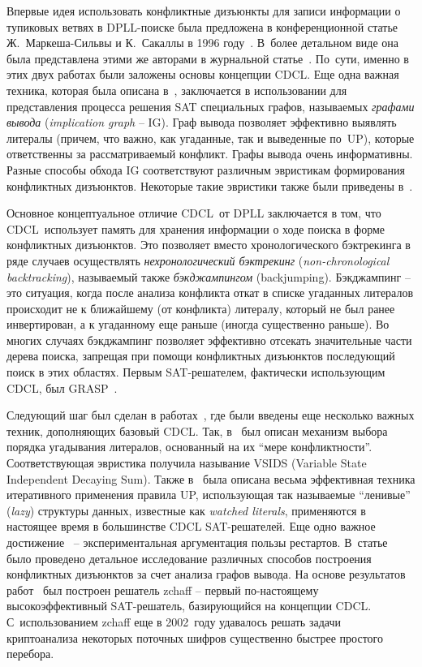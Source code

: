 Впервые идея использовать конфликтные дизъюнкты для записи информации о тупиковых ветвях в DPLL-поиске была предложена в конференционной статье Ж.~Маркеша-Сильвы и К.~Сакаллы в 1996 году~\cite{grasp}.
В~более детальном виде она была представлена этими же авторами в журнальной статье~\cite{marques-silva1999}.
По~сути, именно в этих двух работах были заложены основы концепции CDCL.
Еще одна важная техника, которая была описана в~\cite{grasp,marques-silva1999}, заключается в использовании для представления процесса решения SAT специальных графов, называемых \textit{графами вывода} (\textit{implication graph} \--- IG).
Граф вывода позволяет эффективно выявлять литералы (причем, что важно, как угаданные, так и выведенные по~UP), которые ответственны за рассматриваемый конфликт.
Графы вывода очень информативны.
Разные способы обхода IG соответствуют различным эвристикам формирования конфликтных дизъюнктов. Некоторые такие эвристики также были приведены в~\cite{grasp,marques-silva1999}.

Основное концептуальное отличие CDCL~от DPLL заключается в том, что CDCL~использует память для хранения информации о ходе поиска в форме конфликтных дизъюнктов.
Это позволяет вместо хронологического бэктрекинга в ряде случаев осуществлять \textit{нехронологический бэктрекинг} (\textit{non-chronological backtracking}), называемый также \textit{бэкджампингом} (backjumping).
Бэкджампинг \--- это ситуация, когда после анализа конфликта откат в списке угаданных литералов происходит не к ближайшему (от конфликта) литералу, который не был ранее инвертирован, а к угаданному еще раньше (иногда существенно раньше).
Во многих случаях бэкджампинг позволяет эффективно отсекать значительные части дерева поиска, запрещая при помощи конфликтных дизъюнктов последующий поиск в этих областях.
Первым SAT-решателем, фактически использующим CDCL, был GRASP~\cite{grasp}.

Следующий шаг был сделан в работах~\cite{moskewicz2001,zhang2001}, где были введены еще несколько важных техник, дополняющих базовый CDCL.
Так, в~\cite{moskewicz2001} был описан механизм выбора порядка угадывания литералов, основанный на их \enquote{мере конфликтности}.
Соответствующая эвристика получила называние VSIDS (Variable State Independent Decaying Sum).
Также в~\cite{moskewicz2001} была описана весьма эффективная техника итеративного применения правила UP, использующая так называемые \enquote{ленивые} (\textit{lazy}) структуры данных, известные как \textit{watched literals}, применяются в настоящее время в большинстве CDCL SAT-решателей.
Еще одно важное достижение~\cite{moskewicz2001} \--- экспериментальная аргументация пользы рестартов.
В~статье~\cite{zhang2001} было проведено детальное исследование различных способов построения конфликтных дизъюнктов за счет анализа графов вывода.
На основе результатов работ~\cite{moskewicz2001,zhang2001} был построен решатель zchaff \--- первый по-настоящему высокоэффективный SAT-решатель, базирующийся на концепции CDCL.
С~использованием zchaff еще в 2002~году удавалось решать задачи криптоанализа некоторых поточных шифров существенно быстрее простого перебора.

